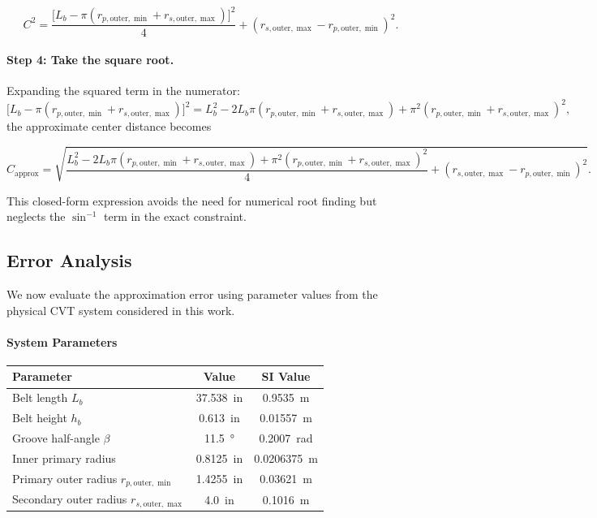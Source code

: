 \documentclass[11pt]{article}
\numberwithin{equation}{section}
\begin{document}
\begin{equation}
C^2
=
\frac{\bigl[L_b - \pi(r_{p,\text{outer},\min} + r_{s,\text{outer},\max})\bigr]^2}{4}
+
(r_{s,\text{outer},\max} - r_{p,\text{outer},\min})^2.
\label{eq:approx_step3}
\end{equation}

\paragraph{Step 4: Take the square root.}

Expanding the squared term in the numerator:
\[
\bigl[L_b - \pi(r_{p,\text{outer},\min} + r_{s,\text{outer},\max})\bigr]^2
=
L_b^2 - 2L_b\pi(r_{p,\text{outer},\min} + r_{s,\text{outer},\max}) + \pi^2(r_{p,\text{outer},\min} + r_{s,\text{outer},\max})^2,
\]
the approximate center distance becomes

\begin{equation}
\boxed{
C_{\mathrm{approx}}
=
\sqrt{
\frac{L_b^2 - 2L_b\pi(r_{p,\text{outer},\min} + r_{s,\text{outer},\max}) + \pi^2(r_{p,\text{outer},\min} + r_{s,\text{outer},\max})^2}{4}
+
(r_{s,\text{outer},\max} - r_{p,\text{outer},\min})^2
}.
}
\label{eq:C_approx}
\end{equation}

This closed-form expression avoids the need for numerical root finding
but neglects the $\sin^{-1}$ term in the exact constraint.

\subsection{Error Analysis}

We now evaluate the approximation error using parameter values
from the physical CVT system considered in this work.

\paragraph{System Parameters}

\begin{center}
\begin{tabular}{lcc}
\toprule
\textbf{Parameter} & \textbf{Value} & \textbf{SI Value} \\
\midrule
Belt length $L_b$ & \SI{37.538}{in} & \SI{0.9535}{m} \\
Belt height $h_b$ & \SI{0.613}{in} & \SI{0.01557}{m} \\
Groove half-angle $\beta$ & \SI{11.5}{\degree} & \SI{0.2007}{rad} \\
Inner primary radius & \SI{0.8125}{in} & \SI{0.0206375}{m} \\
Primary outer radius $r_{p,\text{outer},\min}$ & \SI{1.4255}{in} & \SI{0.03621}{m} \\
Secondary outer radius $r_{s,\text{outer},\max}$ & \SI{4.0}{in} & \SI{0.1016}{m} \\
\bottomrule
\end{tabular}
\end{center}
\end{document}
